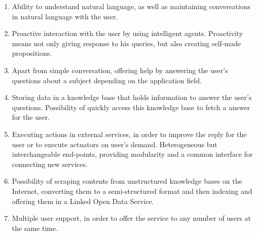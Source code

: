 \begin{enumerate}
	

    \item Ability to understand natural language, as well as maintaining conversations in natural language with the user.
    
    
    \item Proactive interaction with the user by using intelligent agents. Proactivity means not only giving response to his queries, but also creating self-made propositions. 
    
    \item Apart from simple conversation, offering help by answering the user's questions about a subject depending on the application field. 
    
    \item Storing data in a knowledge base that holds information to  answer the user's questions. Possibility of quickly access this knowledge base to fetch a answer for the user.
    
    \item Executing actions in external services, in order to improve the reply for the user or to execute actuators on user's demand. 
    Heterogeneous but interchangeable end-points, providing modularity and a common interface for connecting new services.
    
    \item Possibility of scraping contents from unstructured knowledge bases on the Internet, converting them to a semi-structured format and then indexing and offering them in a Linked Open Data Service.

    \item Multiple user support, in order to offer the service to any number of users at the same time.
    
    

\end{enumerate}




